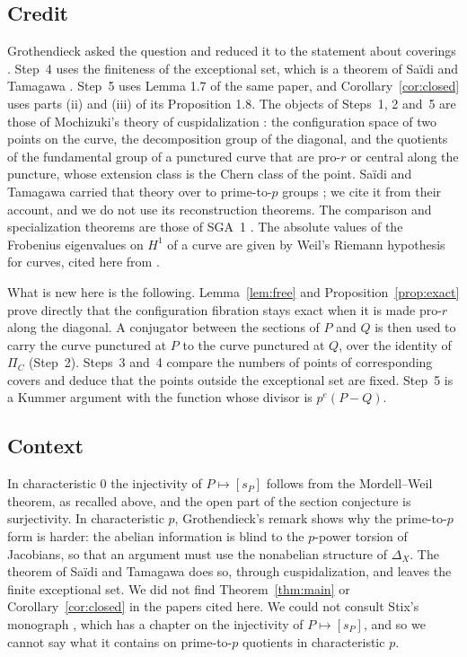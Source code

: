 \documentclass[11pt]{amsart}
\theoremstyle{remark}
\begin{document}
\subsection{Credit}
Grothendieck asked the question and reduced it to the statement about coverings \cite[ms.~pp.~17--18]{Archive}. Step~4 uses the finiteness of the exceptional set, which is a theorem of Sa\"idi and Tamagawa \cite[Proposition 1.8(vi)]{ST09}. Step~5 uses Lemma 1.7 of the same paper, and Corollary~\ref{cor:closed} uses parts (ii) and (iii) of its Proposition 1.8. The objects of Steps~1, 2 and~5 are those of Mochizuki's theory of cuspidalization \cite{Moch}: the configuration space of two points on the curve, the decomposition group of the diagonal, and the quotients of the fundamental group of a punctured curve that are pro-$r$ or central along the puncture, whose extension class is the Chern class of the point. Sa\"idi and Tamagawa carried that theory over to prime-to-$p$ groups \cite[\S 2]{ST09}; we cite it from their account, and we do not use its reconstruction theorems. The comparison and specialization theorems are those of SGA~1 \cite{SGA1}. The absolute values of the Frobenius eigenvalues on $H^1$ of a curve are given by Weil's Riemann hypothesis for curves, cited here from \cite[Th\'eor\`eme 1.6]{WeilI}.

What is new here is the following. Lemma~\ref{lem:free} and Proposition~\ref{prop:exact} prove directly that the configuration fibration stays exact when it is made pro-$r$ along the diagonal. A conjugator between the sections of $P$ and $Q$ is then used to carry the curve punctured at $P$ to the curve punctured at $Q$, over the identity of $\Pi_C$ (Step~2). Steps~3 and~4 compare the numbers of points of corresponding covers and deduce that the points outside the exceptional set are fixed. Step~5 is a Kummer argument with the function whose divisor is $p^e(P-Q)$.

\subsection{Context}
In characteristic $0$ the injectivity of $P\mapsto[s_P]$ follows from the Mordell--Weil theorem, as recalled above, and the open part of the section conjecture is surjectivity. In characteristic $p$, Grothendieck's remark shows why the prime-to-$p$ form is harder: the abelian information is blind to the $p$-power torsion of Jacobians, so that an argument must use the nonabelian structure of $\Delta_X$. The theorem of Sa\"idi and Tamagawa does so, through cuspidalization, and leaves the finite exceptional set. We did not find Theorem~\ref{thm:main} or Corollary~\ref{cor:closed} in the papers cited here. We could not consult Stix's monograph \cite{Stix}, which has a chapter on the injectivity of $P\mapsto[s_P]$, and so we cannot say what it contains on prime-to-$p$ quotients in characteristic $p$.
\end{document}
